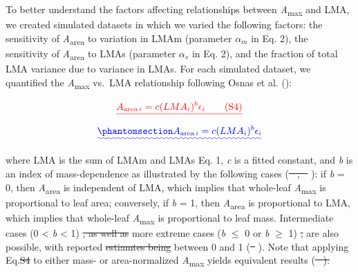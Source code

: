 \documentclass[
  12pt,
  letterpaper,
  DIV=11,
  numbers=noendperiod]{scrartcl}
\numberwithin{equation}{section} %
\providecommand{\DIFadd}[1]{{\protect\color{blue}\uwave{#1}}} %
\providecommand{\DIFdel}[1]{{\protect\color{red}\sout{#1}}}                      %
\providecommand{\DIFaddbegin}{} %
\providecommand{\DIFaddend}{} %
\providecommand{\DIFdelbegin}{} %
\providecommand{\DIFdelend}{} %
\newcommand{\DIFscaledelfig}{0.5}
\newlength{\DIFdelgraphicswidth} %
\newlength{\DIFdelgraphicsheight} %
\newcommand{\DIFaddincludegraphics}[2][]{{\color{blue}\fbox{\DIFOincludegraphics[#1]{#2}}}} %
\newcommand{\DIFdelincludegraphics}[2][]{%
\sbox{\DIFdelgraphicsbox}{\DIFOincludegraphics[#1]{#2}}%
\settoboxwidth{\DIFdelgraphicswidth}{\DIFdelgraphicsbox} %
\settoboxtotalheight{\DIFdelgraphicsheight}{\DIFdelgraphicsbox} %
\scalebox{\DIFscaledelfig}{%
\parbox[b]{\DIFdelgraphicswidth}{\usebox{\DIFdelgraphicsbox}\\[-\baselineskip] \rule{\DIFdelgraphicswidth}{0em}}\llap{\resizebox{\DIFdelgraphicswidth}{\DIFdelgraphicsheight}{%
\setlength{\unitlength}{\DIFdelgraphicswidth}%
\begin{picture}(1,1)%
\thicklines\linethickness{2pt} %
{\color[rgb]{1,0,0}\put(0,0){\framebox(1,1){}}}%
{\color[rgb]{1,0,0}\put(0,0){\line( 1,1){1}}}%
{\color[rgb]{1,0,0}\put(0,1){\line(1,-1){1}}}%
\end{picture}%
}\hspace*{3pt}}} %
} %
\DeclareRobustCommand{\DIFaddbegin}{\DIFOaddbegin \let\includegraphics\DIFaddincludegraphics} %
\DeclareRobustCommand{\DIFaddend}{\DIFOaddend \let\includegraphics\DIFOincludegraphics} %
\DeclareRobustCommand{\DIFdelbegin}{\DIFOdelbegin \let\includegraphics\DIFdelincludegraphics} %
\DeclareRobustCommand{\DIFdelend}{\DIFOaddend \let\includegraphics\DIFOincludegraphics} %
\begin{document}
To better understand the factors affecting relationships between
\emph{A}\textsubscript{max} and LMA, we created simulated datasets in
which we varied the following factors: \DIFaddbegin \DIFadd{(1) }\DIFaddend the sensitivity of
\emph{A}\textsubscript{area} to variation in LMAm (parameter
\(\alpha_m\) in Eq. 2), \DIFaddbegin \DIFadd{(2) }\DIFaddend the sensitivity of
\emph{A}\textsubscript{area} to LMAs (parameter \(\alpha_s\) in Eq. 2),
and \DIFaddbegin \DIFadd{(3) }\DIFaddend the fraction of total LMA variance due to variance in LMAs. For
each simulated dataset, we quantified the \emph{A}\textsubscript{max}
vs.~LMA relationship following Osnas \DIFaddbegin \DIFadd{JLD }\DIFaddend et al.
():

\DIFdelbegin \[
\DIFdel{A_{\mathrm{area} \, i} = c (LMA_i)^{b}\epsilon_i \qquad(\mathrm{S}4)
}\]%
\DIFdelend \DIFaddbegin \begin{equation}\DIFadd{\phantomsection\label{eq-mass}{
A_{\mathrm{area} \, i} = c (LMA_i)^{b}\epsilon_i
}}\end{equation}\DIFaddend 

where LMA is the sum of LMAm and LMAs \DIFaddbegin \DIFadd{(}\DIFaddend Eq. 1\DIFaddbegin \DIFadd{)}\DIFaddend , \emph{c} is a fitted
constant, and \emph{b} is an index of mass-dependence as illustrated by
the following cases (\DIFdelbegin \DIFdel{\mbox{%
\citeproc{ref-Osnas2018}{Osnas et al., 2018}}\hspace{0pt}%
,
\mbox{%
\citeproc{ref-Osnas2013}{2013}}\hspace{0pt}%
}\DIFdelend \DIFaddbegin \DIFadd{\mbox{%
\citeproc{ref-Osnas2013}{Osnas JLD et al. 2013}}\hspace{0pt}%
,
\mbox{%
\citeproc{ref-Osnas2018}{2018}}\hspace{0pt}%
}\DIFaddend ): if \emph{b} = 0, then
\emph{A}\textsubscript{area} is independent of LMA, which implies that
whole-leaf \emph{A}\textsubscript{max} is proportional to leaf area;
conversely, if \emph{b} = 1, then \emph{A}\textsubscript{area} is
proportional to LMA, which implies that whole-leaf
\emph{A}\textsubscript{max} is proportional to leaf mass. Intermediate
cases (0 \textless{} \emph{b} \textless{} 1) \DIFdelbegin \DIFdel{, as well as }\DIFdelend \DIFaddbegin \DIFadd{and }\DIFaddend more extreme cases
(\emph{b} \(\le\) 0 or \emph{b} \(\geq\) 1) \DIFdelbegin \DIFdel{, }\DIFdelend are also possible, with
reported \DIFdelbegin \DIFdel{estiamtes being }\DIFdelend \DIFaddbegin \DIFadd{estimates ranging }\DIFaddend between 0 and 1
(\DIFdelbegin \DIFdel{\mbox{%
\citeproc{ref-Osnas2018}{Osnas et al., 2018}}\hspace{0pt}%
}\DIFdelend \DIFaddbegin \DIFadd{\mbox{%
\citeproc{ref-Osnas2018}{Osnas JLD et al. 2018}}\hspace{0pt}%
}\DIFaddend ). Note that applying
Eq.\DIFdelbegin \DIFdel{S4 }\DIFdelend \DIFaddbegin \DIFadd{~\ref{eq-mass} }\DIFaddend to either mass- or area-normalized
\emph{A}\textsubscript{max} yields equivalent results
(\DIFdelbegin \DIFdel{\mbox{%
\citeproc{ref-Osnas2018}{Osnas et al., 2018}}\hspace{0pt}%
).
}%
\end{document}

